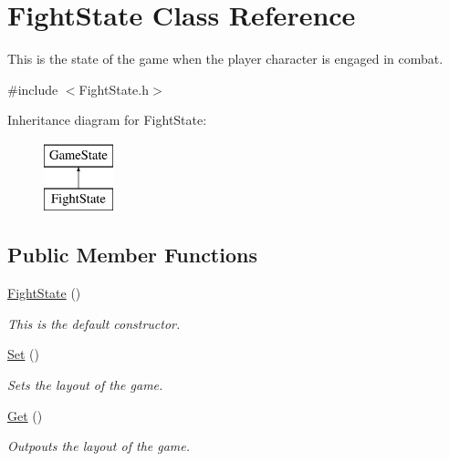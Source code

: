 \hypertarget{classFightState}{\section{Fight\-State Class Reference}
\label{classFightState}
}


This is the state of the game when the player character is engaged in combat.  




{\ttfamily \#include $<$Fight\-State.\-h$>$}

Inheritance diagram for Fight\-State\-:\begin{figure}[H]
\begin{center}
\leavevmode
\includegraphics[height=2.000000cm]{classFightState}
\end{center}
\end{figure}
\subsection*{Public Member Functions}
\begin{DoxyCompactItemize}
\item 
\hypertarget{classFightState_afe4bbc2ba8a3aac74abca651bf23e91d}{\hyperlink{classFightState_afe4bbc2ba8a3aac74abca651bf23e91d}{Fight\-State} ()}\label{classFightState_afe4bbc2ba8a3aac74abca651bf23e91d}

\begin{DoxyCompactList}\small\item\em This is the default constructor. \end{DoxyCompactList}\item 
\hypertarget{classFightState_a6acae30853282788fcf9169c6e69b34f}{\hyperlink{classFightState_a6acae30853282788fcf9169c6e69b34f}{Set} ()}\label{classFightState_a6acae30853282788fcf9169c6e69b34f}

\begin{DoxyCompactList}\small\item\em Sets the layout of the game. \end{DoxyCompactList}\item 
\hypertarget{classFightState_a7595516799fb5f9a4c5866d08608dc0c}{\hyperlink{classFightState_a7595516799fb5f9a4c5866d08608dc0c}{Get} ()}\label{classFightState_a7595516799fb5f9a4c5866d08608dc0c}

\begin{DoxyCompactList}\small\item\em Outpouts the layout of the game. \end{DoxyCompactList}\end{DoxyCompactItemize}
